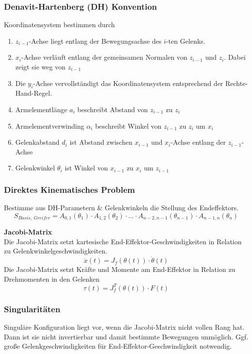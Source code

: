\subsubsection{Denavit-Hartenberg (DH) Konvention}%
\label{kin:ssub:denavit-hartenberg}
Koordinatensystem bestimmen durch
\begin{enumerate}
\item \(z_{i-1}\)-Achse liegt entlang der Bewegungsachse des \(i\)-ten Gelenks.
\item \(x_i\)-Achse verläuft entlang der gemeinsamen Normalen von \(z_{i-1}\) und \(z_i\). Dabei zeigt sie weg von \(z_{i-1}\)
\item Die \(y_i\)-Achse vervollständigt das Koordinatensystem entsprechend der Rechte-Hand-Regel.
\item Armelementlänge \(a_i\) beschreibt Abstand von \(z_{i-1}\) zu \(z_i\)
\item Armelementverwinding \(\alpha_i\) beschreibt Winkel von \(z_{i-1}\) zu \(z_i\) um \(x_i\)
\item Gelenkabstand \(d_i\) ist Abstand zwischen \(x_{i-1}\) und \(x_i\)-Achse entlang der \(z_{i-1}\)-Achse
\item Gelenkwinkel \(\theta_i\) ist Winkel von \(x_{i-1}\) zu \(x_i\) um \(z_{i-1}\)
\end{enumerate}

\subsubsection{Direktes Kinematisches Problem}%
\label{kin:ssub:direktes-problem}
Bestimme aus DH-Parametern \& Gelenkwinkeln die Stellung des Endeffektors.
\[S_{\mathit{Basis},\ \mathit{Greifer}} = A_{0,1}(\theta_1) \cdot A_{1,2}(\theta_2) \cdot \ldots
  \cdot A_{n-2,n-1}(\theta_{n-1}) \cdot A_{n-1, n}(\theta_n)\]

\textbf{Jacobi-Matrix}\\
Die Jacobi-Matrix setzt kartesische End-Effektor-Geschwindigkeiten in Relation zu Gelenkwinkelgeschwindigkeiten.
\[\dot{x}(t)=J_f(\theta(t)) \cdot \dot{\theta}(t)\]
Die Jacobi-Matrix setzt Kräfte und Momente am End-Effektor in Relation zu Drehmomenten in den Gelenken
\[\tau(t) = J_f^T(\theta(t)) \cdot F(t)\]

\subsubsection{Singularitäten}%
\label{kin:ssub:singularitaeten}
Singuläre Konfiguration liegt vor, wenn die Jacobi-Matrix nicht vollen Rang hat.\\
Dann ist sie nicht invertierbar und damit bestimmte Bewegungen unmöglich. Ggf. große Gelenkgeschwindigkeiten
für End-Effektor-Geschwindigkeit notwendig.\\

